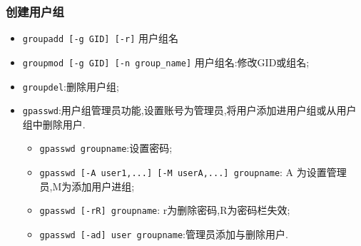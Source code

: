 \subsubsection{创建用户组}
\begin{itemize}
    \item \texttt{groupadd [-g GID] [-r]} 用户组名

    \item \texttt{groupmod [-g GID] [-n group\_name]} 用户组名:修改GID或组名;

    \item \texttt{groupdel}:删除用户组;

    \item \texttt{gpasswd}:用户组管理员功能,设置账号为管理员,将用户添加进用户组或从用户组中删除用户.

    \begin{itemize}
        \item \texttt{gpasswd groupname}:设置密码;
        \item \texttt{gpasswd [-A user1,...] [-M userA,...] groupname}: A 为设置管理员,M为添加用户进组;
        \item \texttt{gpasswd [-rR] groupname}: r为删除密码,R为密码栏失效;

        \item \texttt{gpasswd [-ad] user groupname}:管理员添加与删除用户.
    \end{itemize}
\end{itemize}

